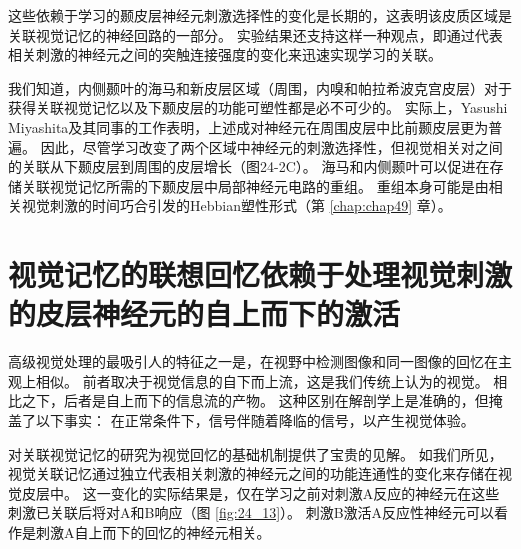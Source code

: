 这些依赖于学习的颞皮层神经元刺激选择性的变化是长期的，这表明该皮质区域是关联视觉记忆的神经回路的一部分。
实验结果还支持这样一种观点，即通过代表相关刺激的神经元之间的突触连接强度的变化来迅速实现学习的关联。


我们知道，内侧颞叶的海马和新皮层区域（周围，内嗅和帕拉希波克宫皮层）对于获得关联视觉记忆以及下颞皮层的功能可塑性都是必不可少的。
实际上，Yasushi Miyashita及其同事的工作表明，上述成对神经元在周围皮层中比前颞皮层更为普遍。
因此，尽管学习改变了两个区域中神经元的刺激选择性，但视觉相关对之间的关联从下颞皮层到周围的皮层增长（图24-2C）。
海马和内侧颞叶可以促进在存储关联视觉记忆所需的下颞皮层中局部神经元电路的重组。
重组本身可能是由相关视觉刺激的时间巧合引发的Hebbian塑性形式（第 \ref{chap:chap49} 章）。



\section{视觉记忆的联想回忆依赖于处理视觉刺激的皮层神经元的自上而下的激活}

高级视觉处理的最吸引人的特征之一是，在视野中检测图像和同一图像的回忆在主观上相似。
前者取决于视觉信息的自下而上流，这是我们传统上认为的视觉。
相比之下，后者是自上而下的信息流的产物。
这种区别在解剖学上是准确的，但掩盖了以下事实：
在正常条件下，信号伴随着降临的信号，以产生视觉体验。


对关联视觉记忆的研究为视觉回忆的基础机制提供了宝贵的见解。
如我们所见，视觉关联记忆通过独立代表相关刺激的神经元之间的功能连通性的变化来存储在视觉皮层中。
这一变化的实际结果是，仅在学习之前对刺激A反应的神经元在这些刺激已关联后将对A和B响应（图 \ref{fig:24_13}）。
刺激B激活A反应性神经元可以看作是刺激A自上而下的回忆的神经元相关。


